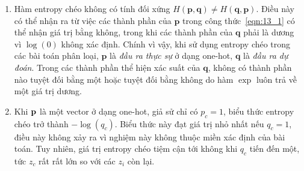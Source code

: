 \begin{mydeff}
\begin{enumerate}
\item Hàm entropy chéo không có tính đối xứng $H(\mathbf{p},
\mathbf{q}) \neq H(\mathbf{q}, \mathbf{p})$. Điều này có thể nhận ra
từ việc các thành phần của $\mathbf{p}$ trong công thức~\eqref{eqn:13_1} có
thể nhận giá trị bằng không, trong khi các thành phần của $\mathbf{q}$ phải
là dương vì $\log(0)$ không xác định. Chính vì vậy, khi sử dụng entropy chéo
trong các bài toán phân loại, $\mathbf{p}$ là \textit{đầu ra thực sự} ở dạng
one-hot, $\mathbf{q}$ là \textit{đầu ra dự đoán}. Trong các thành phần thể
hiện xác suất của $\mathbf{q}$, không có thành phần nào tuyệt đối bằng một
hoặc tuyệt đối bằng không do hàm $\exp$ luôn trả về một giá trị dương.

\item Khi $\mathbf{p}$ là một vector ở dạng one-hot, giả sử chỉ có $p_c = 1$, biểu thức entropy chéo trở thành $-\log(q_c)$. Biểu thức này đạt giá trị
nhỏ nhất nếu $q_c = 1$, điều này không xảy ra vì nghiệm này không thuộc miền
xác định của bài toán. Tuy nhiên, giá trị entropy chéo tiệm cận tới không
khi $q_c$ tiến đến một, tức $z_c$ rất rất lớn so với các $z_i$ còn lại.
\end{enumerate}
\end{mydeff}

